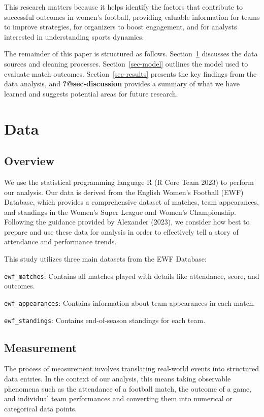 \documentclass[
  letterpaper,
  DIV=11,
  numbers=noendperiod]{scrartcl}
\begin{document}
This research matters because it helps identify the factors that
contribute to successful outcomes in women's football, providing
valuable information for teams to improve strategies, for organizers to
boost engagement, and for analysts interested in understanding sports
dynamics.

The remainder of this paper is structured as follows.
Section~\ref{sec-data} discusses the data sources and cleaning
processes. Section~\ref{sec-model} outlines the model used to evaluate
match outcomes. Section~\ref{sec-results} presents the key findings from
the data analysis, and \textbf{?@sec-discussion} provides a summary of
what we have learned and suggests potential areas for future research.

\hypertarget{sec-data}{%
\section{Data}\label{sec-data}}

\hypertarget{overview}{%
\subsection{Overview}\label{overview}}

We use the statistical programming language R (R Core Team 2023) to
perform our analysis. Our data is derived from the English Women's
Football (EWF) Database, which provides a comprehensive dataset of
matches, team appearances, and standings in the Women's Super League and
Women's Championship. Following the guidance provided by Alexander
(2023), we consider how best to prepare and use these data for analysis
in order to effectively tell a story of attendance and performance
trends.

This study utilizes three main datasets from the EWF Database:

\texttt{ewf\_matches}: Contains all matches played with details like
attendance, score, and outcomes.

\texttt{ewf\_appearances}: Contains information about team appearances
in each match.

\texttt{ewf\_standings}: Contains end-of-season standings for each team.

\hypertarget{measurement}{%
\subsection{Measurement}\label{measurement}}

The process of measurement involves translating real-world events into
structured data entries. In the context of our analysis, this means
taking observable phenomena such as the attendance of a football match,
the outcome of a game, and individual team performances and converting
them into numerical or categorical data points.
\end{document}
